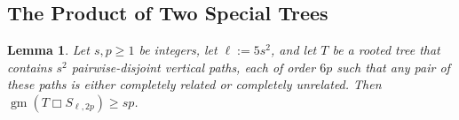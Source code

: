 \documentclass[kpfonts,lotsofwhite]{patmorin}
\newcommand{\boxprod}{\mathbin{\Box}}
\renewcommand{\ge}{\geqslant}
\renewcommand{\le}{\leqslant}
\DeclareMathOperator{\gm}{gm}
\newcommand{\pat}[1]{\textcolor{Maroon}{PM: #1}}
\theoremstyle{plain}
\newtheorem{lem}[thm]{Lemma}
\theoremstyle{definition}
\begin{document}
%
%

\subsection{The Product of Two Special Trees}


\begin{lem}\label{star_times_star}
  Let $s,p\ge 1$ be integers, let $\ell:=5s^2$, and let $T$ be a rooted tree that contains $s^2$ pairwise-disjoint vertical paths, each of order $6p$ such that any pair of these paths is either completely related or completely unrelated.  Then $\gm(T\boxprod S_{\ell,2p})\ge sp$.
\end{lem}
\end{document}

